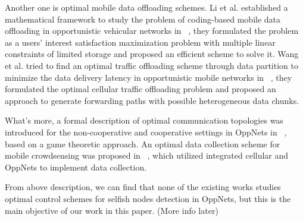 Another one is optimal mobile data offloading schemes. Li et al. established a mathematical framework to study the problem of coding-based mobile data offloading in opportunistic vehicular networks in ~\cite{DBLP:journals/tits/LiJWZ014}, they formulated the problem as a users' interest satisfaction maximization problem with multiple linear constraints of limited storage and proposed an efficient scheme to solve it. Wang et al. tried to find an optimal traffic offloading scheme through data partition to minimize the data delivery latency in opportunistic mobile networks in ~\cite{BLP:conf/icc/WangW18}, they formulated the optimal cellular traffic offloading problem and proposed an approach to generate forwarding paths with possible heterogeneous data chunks.

What's more, a formal description of optimal communication topologies was introduced for the non-cooperative and cooperative settings in OppNets in ~\cite{DBLP:conf/clima/BullingKP12}, based on a game theoretic approach. An optimal data collection scheme for mobile crowdsensing was proposed in ~\cite{DBLP:journals/access/MajeedZS20}, which utilized integrated cellular and OppNets to implement data collection.

From above description, we can find that none of the existing works studies optimal control schemes for selfish nodes detection in OppNets, but this is the main objective of our work in this paper. (More info later)
